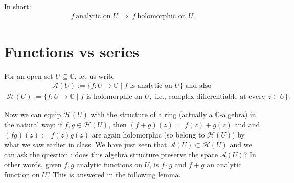 \documentclass[11pt]{article}
\theoremstyle{plain}
\theoremstyle{definition}
\theoremstyle{remark}
\numberwithin{equation}{section}
\newcommand{\be}{\begin{eqnarray}}
\newcommand{\ee}{\end{eqnarray}}
\newcommand{\C}{\mathbb{C}}
\begin{document}
In short:
\be
 f\ \text{analytic on }U\ \Longrightarrow\ f\ \text{holomorphic on }U.
\ee

\section{Functions vs series}

\newcommand{\hol}{\mathscr{H}}
\newcommand{\An}{\mathscr{A}}

For an open set $U\subseteq\C$, let us write
\be
 \An(U):=\{f\colon U\to\C\mid f\text{ is analytic on }U\} \text{ and also }
\ee
\be
 \hol(U):=\{f\colon U\to\C\mid
 f\text{ is holomorphic on }U,\text{ i.e., complex differentiable at every }z\in U\}.
\ee

Now we can equip $\hol(U)$ with the structure of a ring (actually a $\C$-algebra) in the natural way: if $f, g \in \hol(U)$, then $(f+g)(z):= f(z)+g(z)$ and and $(fg)(z):=f(z)g(z)$ are again holomorphic (so belong to $\hol(U)$) by what we saw earlier in class. We have just seen that $\An(U) \subset \hol(U)$ and we can ask the question : does this algebra structure preserve the space $\An(U)$? In other words, given $f, g$ analytic functions on $U$, is $f \cdot g$ and $f+g$ an analytic function on $U$? This is answered in the following lemma.
\end{document}
